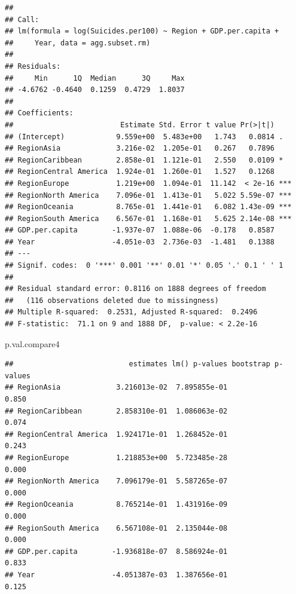 \documentclass[11pt,]{article}
\newenvironment{Shaded}{\begin{snugshade}}{\end{snugshade}}
\newcommand{\NormalTok}[1]{#1}
\begin{document}
\begin{verbatim}
## 
## Call:
## lm(formula = log(Suicides.per100) ~ Region + GDP.per.capita + 
##     Year, data = agg.subset.rm)
## 
## Residuals:
##     Min      1Q  Median      3Q     Max 
## -4.6762 -0.4640  0.1259  0.4729  1.8037 
## 
## Coefficients:
##                         Estimate Std. Error t value Pr(>|t|)    
## (Intercept)            9.559e+00  5.483e+00   1.743   0.0814 .  
## RegionAsia             3.216e-02  1.205e-01   0.267   0.7896    
## RegionCaribbean        2.858e-01  1.121e-01   2.550   0.0109 *  
## RegionCentral America  1.924e-01  1.260e-01   1.527   0.1268    
## RegionEurope           1.219e+00  1.094e-01  11.142  < 2e-16 ***
## RegionNorth America    7.096e-01  1.413e-01   5.022 5.59e-07 ***
## RegionOceania          8.765e-01  1.441e-01   6.082 1.43e-09 ***
## RegionSouth America    6.567e-01  1.168e-01   5.625 2.14e-08 ***
## GDP.per.capita        -1.937e-07  1.088e-06  -0.178   0.8587    
## Year                  -4.051e-03  2.736e-03  -1.481   0.1388    
## ---
## Signif. codes:  0 '***' 0.001 '**' 0.01 '*' 0.05 '.' 0.1 ' ' 1
## 
## Residual standard error: 0.8116 on 1888 degrees of freedom
##   (116 observations deleted due to missingness)
## Multiple R-squared:  0.2531, Adjusted R-squared:  0.2496 
## F-statistic:  71.1 on 9 and 1888 DF,  p-value: < 2.2e-16
\end{verbatim}

\begin{Shaded}
\begin{Highlighting}[]
\NormalTok{p.val.compare4}
\end{Highlighting}
\end{Shaded}

\begin{verbatim}
##                           estimates lm() p-values bootstrap p-values
## RegionAsia             3.216013e-02  7.895855e-01              0.850
## RegionCaribbean        2.858310e-01  1.086063e-02              0.074
## RegionCentral America  1.924171e-01  1.268452e-01              0.243
## RegionEurope           1.218853e+00  5.723485e-28              0.000
## RegionNorth America    7.096179e-01  5.587265e-07              0.000
## RegionOceania          8.765214e-01  1.431916e-09              0.000
## RegionSouth America    6.567108e-01  2.135044e-08              0.000
## GDP.per.capita        -1.936818e-07  8.586924e-01              0.833
## Year                  -4.051387e-03  1.387656e-01              0.125
\end{verbatim}
\end{document}
